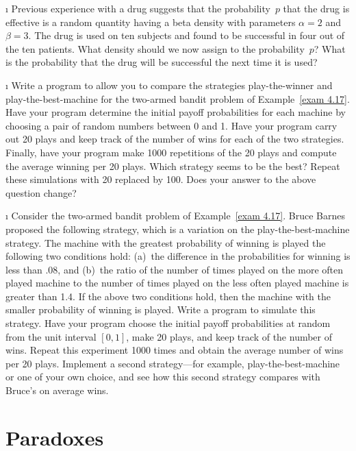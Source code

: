 \begin{LJSItem}
\i\label{exer 4.2.11} Previous experience with a drug suggests that the probability~$p$ that
the drug is effective is a random quantity having a beta density with
parameters $\alpha = 2$ and $\beta = 3$.  The drug is used on ten subjects and
found to be successful in four out of the ten patients.  What density should we
now assign to the probability~$p$?  What is the probability that the drug will
be successful the next time it is used?

\i\label{exer 4.2.12} Write a program to allow you to compare the strategies play-the-winner
and play-the-best-machine for the two-armed bandit problem of Example~\ref{exam
4.17}.  Have your program determine the initial payoff probabilities for
each machine by choosing a pair of random numbers between 0 and 1.  Have your
program carry out 20 plays and keep track of the number of wins for each of the
two strategies.  Finally, have your program make 1000 repetitions of the 20
plays and compute the average winning per 20 plays.  Which strategy seems to be
the best?  Repeat these simulations with 20 replaced by 100.  Does your answer to the
above question change?

\i\label{exer 4.2.13} Consider the two-armed bandit problem of Example~\ref{exam 4.17}. 
Bruce Barnes proposed the following strategy, which is a variation on the
play-the-best-machine strategy.  The machine with the greatest probability of
winning is played  the following two conditions hold: (a)~the
difference in the probabilities for winning is less than .08, and (b)~the ratio
of the number of times played on the more often played machine to the number of
times played on the less often played machine is greater than 1.4.  If the
above two conditions hold, then the machine with the smaller probability of
winning is played.  Write a program to simulate this strategy.  Have your
program choose the initial payoff probabilities at random from the unit
interval $[0,1]$, make 20 plays, and keep track of the number of wins. 
Repeat this experiment 1000 times and obtain the average number of wins per 20
plays.  Implement a second strategy---for example, play-the-best-machine or one
of your own choice, and see how this second strategy compares with Bruce's on
average wins.

\end{LJSItem}

\section{Paradoxes}\label{sec 4.3}

